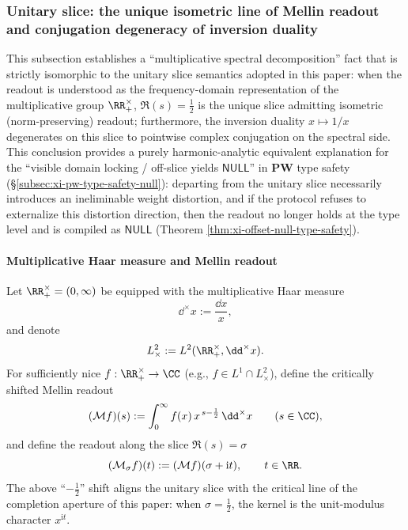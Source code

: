 
\subsubsection{Unitary slice: the unique isometric line of Mellin readout and conjugation degeneracy of inversion duality}\label{subsubsec:xi-mellin-unitary-slice}

This subsection establishes a ``multiplicative spectral decomposition'' fact that is strictly isomorphic to the unitary slice semantics adopted in this paper: when the readout is understood as the frequency-domain representation of the multiplicative group \(\RR_{+}^{\times}\), \(\Re(s)=\tfrac12\) is the unique slice admitting isometric (norm-preserving) readout; furthermore, the inversion duality \(x\mapsto 1/x\) degenerates on this slice to pointwise complex conjugation on the spectral side.
This conclusion provides a purely harmonic-analytic equivalent explanation for the ``visible domain locking / off-slice yields \(\mathsf{NULL}\)'' in \(\mathbf{PW}\) type safety (\S\ref{subsec:xi-pw-type-safety-null}): departing from the unitary slice necessarily introduces an ineliminable weight distortion, and if the protocol refuses to externalize this distortion direction, then the readout no longer holds at the type level and is compiled as \(\mathsf{NULL}\) (Theorem \ref{thm:xi-offset-null-type-safety}).

\paragraph{Multiplicative Haar measure and Mellin readout}
Let \(\RR_{+}^{\times}=(0,\infty)\) be equipped with the multiplicative Haar measure
\[
\dd^{\times}x:=\frac{\dd x}{x},
\]
and denote
\[
L^{2}_{\times}:=L^{2}(\RR_{+}^{\times},\dd^{\times}x).
\]
For sufficiently nice \(f:\RR_{+}^{\times}\to\CC\) (e.g., \(f\in L^{1}\cap L^{2}_{\times}\)), define the critically shifted Mellin readout
\begin{equation}\label{eq:mellin-shifted-readout}
(\mathcal{M}f)(s):=\int_{0}^{\infty} f(x)\,x^{\,s-\frac12}\,\dd^{\times}x
\qquad(s\in\CC),
\end{equation}
and define the readout along the slice \(\Re(s)=\sigma\)
\[
(\mathcal{M}_{\sigma}f)(t):=(\mathcal{M}f)(\sigma+\mathrm{i}t),\qquad t\in\RR.
\]
The above ``\(-\tfrac12\)'' shift aligns the unitary slice with the critical line of the completion aperture of this paper: when \(\sigma=\tfrac12\), the kernel is the unit-modulus character \(x^{\mathrm{i}t}\).


